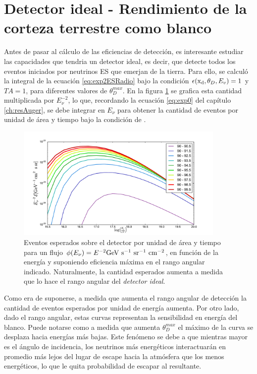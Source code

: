 	
\section{Detector ideal - Rendimiento de la corteza terrestre como blanco}
	Antes de pasar al c\'alculo de las eficiencias de detecci\'on, es interesante estudiar las capacidades que tendria un detector ideal, es decir, que detecte todos los eventos iniciados por neutrinos ES que emerjan de la tierra.
	Para ello, se calcul\'o la integral de la ecuaci\'on \ref{eq:exp2ESRadio} bajo la condici\'on $\epsilon ({\rm x_d},\theta_D,E_v) = 1$ y $TA=1$, para diferentes valores de $\theta_D^{max}$.
	En la figura \ref{fig:exposuresFluxThetas} se grafica esta cantidad multiplicada por $E_\nu^{-2}$, lo que, recordando la ecuaci\'on \ref{eq:exp0} del cap\'itulo \ref{ch:resAuger}, se debe integrar en $E_\nu$ para obtener la cantidad de eventos por unidad de \'area y tiempo bajo la condici\'on de .
%
	\begin{figure}[h!]
		\begin{center}
			\includegraphics[width=0.9\textwidth]{fig/resultadosRadio/exposureFullEff_thetas}
			\caption{\label{fig:exposuresFluxThetas} Eventos esperados sobre el detector por unidad de \'area y tiempo para un flujo $\phi(E_\nu)= E^{-2}{\rm GeV\ s^{-1}\ sr^{-1}\ cm^{-2}}$, en funci\'on de la energ\'ia y suponiendo eficiencia m\'axima en el rango angular indicado.
			Naturalmente, la cantidad esperados aumenta a medida que lo hace el rango angular del \emph{detector ideal}.
			}
		\end{center}
	\end{figure}
	Como era de suponerse, a medida que aumenta el rango angular de detecci\'on la cantidad de eventos esperados por unidad de energ\'ia aumenta.
	Por otro lado, dado el rango angular, estas curvas representan la sensibilidad en energ\'ia del blanco.
	Puede notarse como a medida que aumenta $\theta_D^{max}$ el m\'aximo de la curva se desplaza hacia energ\'ias m\'as bajas.
	Este fen\'omeno se debe a que mientras mayor es el \'angulo de incidencia, los neutrinos m\'as energ\'eticos interactuar\'an en promedio m\'as lejos del lugar de escape hacia la atm\'osfera que los menos energ\'eticos, lo que le quita probabilidad de escapar al \tauon{} resultante.
	
